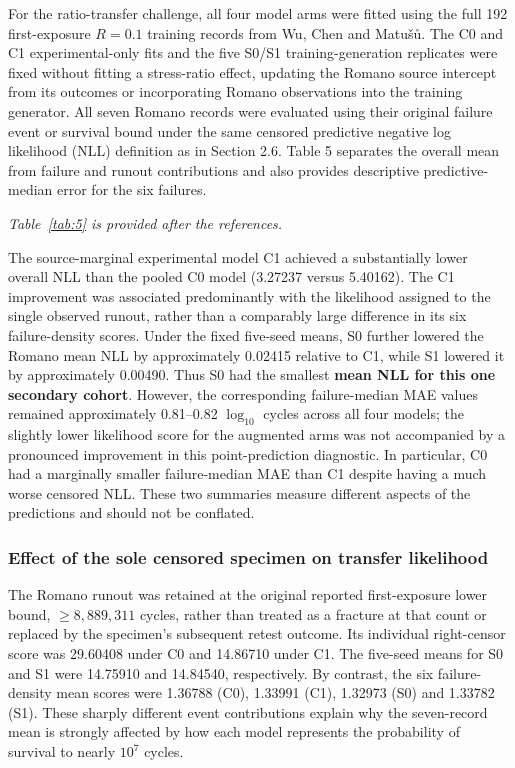 \documentclass[12pt,a4paper]{article}
\begin{document}
For the ratio-transfer challenge, all four model arms were fitted using the full 192 first-exposure \(R=0.1\) training records from Wu, Chen and Matušů. The C0 and C1 experimental-only fits and the five S0/S1 training-generation replicates were fixed without fitting a stress-ratio effect, updating the Romano source intercept from its outcomes or incorporating Romano observations into the training generator. All seven Romano records were evaluated using their original failure event or survival bound under the same censored predictive negative log likelihood (NLL) definition as in Section 2.6. Table 5 separates the overall mean from failure and runout contributions and also provides descriptive predictive-median error for the six failures.

\noindent\textit{Table~\ref{tab:5} is provided after the references.}\par

The source-marginal experimental model C1 achieved a substantially lower overall NLL than the pooled C0 model (3.27237 versus 5.40162). The C1 improvement was associated predominantly with the likelihood assigned to the single observed runout, rather than a comparably large difference in its six failure-density scores. Under the fixed five-seed means, S0 further lowered the Romano mean NLL by approximately 0.02415 relative to C1, while S1 lowered it by approximately 0.00490. Thus S0 had the smallest \textbf{mean NLL for this one secondary cohort}. However, the corresponding failure-median MAE values remained approximately 0.81–0.82 \(\log_{10}\) cycles across all four models; the slightly lower likelihood score for the augmented arms was not accompanied by a pronounced improvement in this point-prediction diagnostic. In particular, C0 had a marginally smaller failure-median MAE than C1 despite having a much worse censored NLL. These two summaries measure different aspects of the predictions and should not be conflated.

\subsubsection{Effect of the sole censored specimen on transfer likelihood}

The Romano runout was retained at the original reported first-exposure lower bound, \(\geq 8{,}889{,}311\) cycles, rather than treated as a fracture at that count or replaced by the specimen's subsequent retest outcome. Its individual right-censor score was 29.60408 under C0 and 14.86710 under C1. The five-seed means for S0 and S1 were 14.75910 and 14.84540, respectively. By contrast, the six failure-density mean scores were 1.36788 (C0), 1.33991 (C1), 1.32973 (S0) and 1.33782 (S1). These sharply different event contributions explain why the seven-record mean is strongly affected by how each model represents the probability of survival to nearly \(10^7\) cycles.
\end{document}
